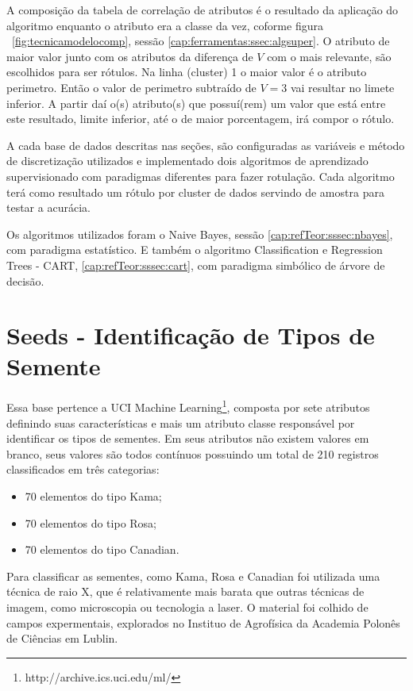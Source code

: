 A composição da tabela de correlação de atributos é o resultado da aplicação do algoritmo enquanto o atributo era a classe da vez, coforme figura ~\ref{fig:tecnicamodelocomp}, sessão \ref{cap:ferramentas:ssec:algsuper}. O atributo de maior valor junto com os atributos da diferença de ${V}$ com o mais relevante, são escolhidos para ser rótulos. Na linha (cluster) 1 o maior valor é o atributo perimetro. Então o valor de perimetro subtraído de ${V=3}$ vai resultar no limete inferior. A partir daí o(s) atributo(s) que possuí(rem) um valor que está entre este resultado, limite inferior, até o de maior porcentagem, irá compor o rótulo.

A cada base de dados descritas nas seções, são configuradas as variáveis e método de discretização utilizados e implementado dois algoritmos de aprendizado supervisionado com paradigmas diferentes para fazer rotulação. Cada algoritmo terá como resultado um rótulo por cluster de dados servindo de amostra para testar a acurácia.

Os algoritmos utilizados foram o Naive Bayes, sessão \ref{cap:refTeor:sssec:nbayes}, com paradigma estatístico. E também o algoritmo Classification e Regression Trees - CART, \ref{cap:refTeor:sssec:cart}, com paradigma simbólico de  árvore de decisão.

\section{Seeds - Identificação de Tipos de Semente}
Essa base pertence a UCI Machine Learning\footnote{http://archive.ics.uci.edu/ml/}, composta por sete  atributos definindo suas características e mais um atributo classe  responsável por identificar os tipos de sementes. Em seus atributos  não existem valores em branco, seus valores são todos contínuos possuindo um total de 210 registros classificados em três categorias:
\begin{itemize}[noitemsep]
 \item 70 elementos do tipo Kama;
 \item 70 elementos do tipo Rosa;
 \item 70 elementos do tipo Canadian.
\end{itemize}
Para classificar as sementes, como Kama, Rosa e Canadian foi utilizada uma técnica de raio X, que é relativamente mais barata que outras técnicas de imagem, como microscopia ou tecnologia a laser. O material foi colhido de campos expermentais, explorados no Instituo de Agrofísica da Academia Polonês de Ciências em Lublin.

